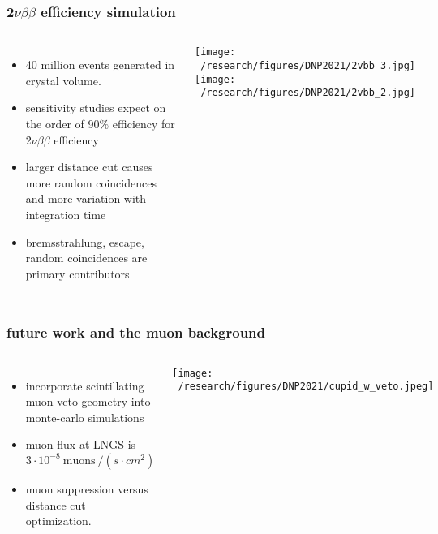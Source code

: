 \documentclass{beamer}
\begin{document}


	\begin{frame}
		\frametitle{2$\nu\beta\beta$ efficiency simulation}
		\begin{columns}[c] %
			
			\begin{itemize}
				\setlength\itemsep{2em}
				\item 40 million events generated in crystal volume.
				\item sensitivity studies expect on the order of 90$\%$ efficiency for 2$\nu\beta\beta$ efficiency
				\item larger distance cut causes more random coincidences and more variation with integration time
				\item bremsstrahlung, escape, random coincidences are primary contributors
			\end{itemize}
			
			\hspace*{0.5cm}\texttt{[image: ~/research/figures/DNP2021/2vbb\_3.jpg]}
			\medskip
			\hspace*{0.5cm}\texttt{[image: ~/research/figures/DNP2021/2vbb\_2.jpg]}
			
		\end{columns}
	\end{frame}



	\begin{frame}
		\frametitle{future work and the muon background}
		\begin{columns}[c] %
			
			\begin{itemize}
				\setlength\itemsep{2em}
				\item incorporate scintillating muon veto geometry into monte-carlo simulations
				\item muon flux at LNGS is $3\cdot 10^{-8} \ \text{muons} \ / \left(s\cdot cm^2\right)$
				\item muon suppression versus distance cut optimization.
			\end{itemize}
			
			\texttt{[image: ~/research/figures/DNP2021/cupid\_w\_veto.jpeg]}

			
		\end{columns}
	\end{frame}
\end{document}
